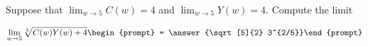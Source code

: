 \documentclass{ximera}
\author{Matthew Carr}
\begin{document}
\begin{exercise}
Suppose that $\lim_{w\to5}C(w)=4$ and $\lim_{w\to5}Y(w)=4$. Compute the limit

\[
\lim_{w\to 5 } \sqrt[5]{C(w)Y(w)+4}\begin{prompt} = \answer{\sqrt[5]{2} 3^{2/5}}\end{prompt}
\]
\end{exercise}
\end{document}
